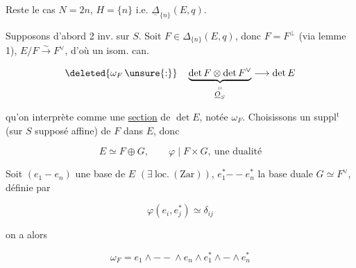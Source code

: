 

Reste le cas $N=2n$,  $H=\{n\}$ i.e. $\underline{\Delta}_{\{n\}}(E,q)$.

  Supposons d'abord 2 inv. sur $S$. Soit $F\in\Delta_{\{n\}}(E,q)$,  donc $F=F^\perp$ (via lemme 1),  $E/F\xrightarrow{\sim}F^\vee$, d'où un isom. can.

\[
\deleted{\omega_F\,\unsure{:}}\quad
\underbrace{\det F\otimes\det F^\vee}_{\substack{\shortparallel\\ \underline{O}_S}}\longrightarrow\det E
\]

qu'on interprète comme une \uline{section} de $\det E$, notée $\omega_F$. Choisissons un suppl$^{\mathrm t}$  (sur $S$ supposé affine) de $F$ dans $E$, donc

\[
E\simeq F\oplus G,\qquad \varphi\mid F\times G,\ \text{une dualité}
\]

Soit $(e_1\mathbin{-}e_n)$ une base de $E$ $(\exists\ \mathrm{loc.}\ (\mathrm{Zar}))$, $e_1^*\mathbin{--}e_n^*$ la base duale $G\simeq F^\vee$, définie par

\[
\varphi(e_i,e_j^*)\simeq\delta_{ij}
\]

on a alors

\[
\omega_F=e_1\wedge\mathbin{--}\wedge e_n\wedge e_1^*\wedge\mathbin{-}\wedge e_n^*
\]

